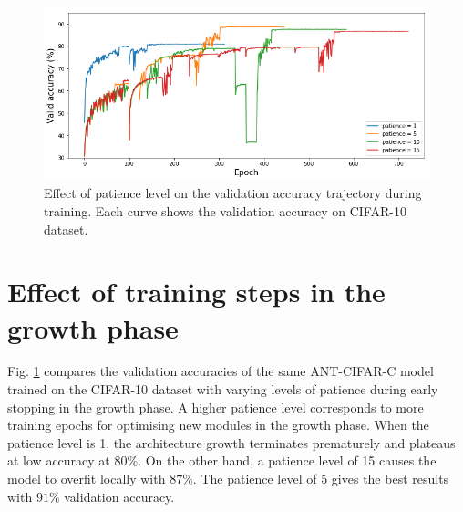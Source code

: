 \begin{figure}[ht]
    \vspace{-4mm}
	\center
	\includegraphics[width=0.7\linewidth]{figures/fig_patience.png}
    \vspace{-4mm}
	\caption{\small Effect of patience level on the validation accuracy trajectory during training. Each curve shows the validation accuracy on CIFAR-10 dataset.}
	\vspace{-4mm}
    \label{fig:patience}
\end{figure}

\vspace{-2mm}
\section{Effect of training steps in the growth
\vspace{-2mm}
phase}\label{sec:supp_effect_of_patience}
Fig. \ref{fig:patience} compares the validation accuracies of the same ANT-CIFAR-C model trained on the CIFAR-10 dataset with varying levels of patience during early stopping in the growth phase. A higher patience level corresponds to more training epochs for optimising new modules in the growth phase. When the patience level is 1, the architecture growth terminates prematurely and plateaus at low accuracy at $80\%$. On the other hand, a patience level of 15 causes the model to overfit locally with  $87\%$. The patience level of 5 gives the best results with $91\%$ validation accuracy.




